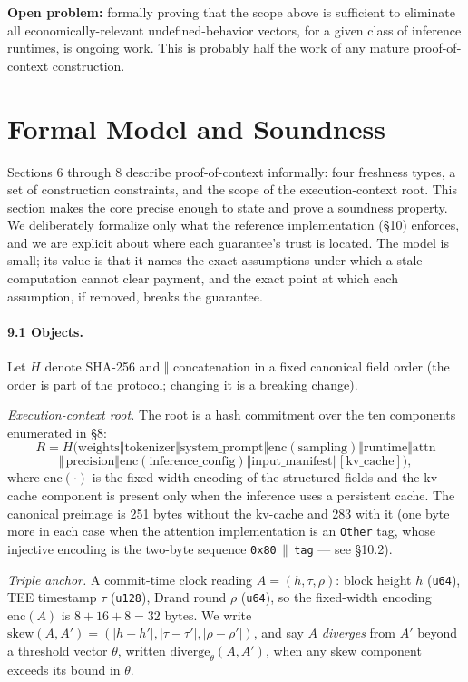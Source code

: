 \documentclass[11pt]{article}
\begin{document}
\textbf{Open problem:} formally proving that the scope above is sufficient to eliminate all economically-relevant undefined-behavior vectors, for a given class of inference runtimes, is ongoing work. This is probably half the work of any mature proof-of-context construction.

\section{Formal Model and Soundness}

Sections 6 through 8 describe proof-of-context informally: four freshness types, a set of construction constraints, and the scope of the execution-context root. This section makes the core precise enough to state and prove a soundness property. We deliberately formalize only what the reference implementation (\S10) enforces, and we are explicit about where each guarantee's trust is located. The model is small; its value is that it names the exact assumptions under which a stale computation cannot clear payment, and the exact point at which each assumption, if removed, breaks the guarantee.

\paragraph{9.1 Objects.} Let $H$ denote SHA-256 and $\Vert$ concatenation in a fixed canonical field order (the order is part of the protocol; changing it is a breaking change).

\emph{Execution-context root.} The root is a hash commitment over the ten components enumerated in \S8:
\[
R = H(\mathrm{weights} \Vert \mathrm{tokenizer} \Vert \mathrm{system\_prompt} \Vert \mathrm{enc(sampling)} \Vert \mathrm{runtime} \Vert \mathrm{attn}
\]
\[
\Vert\, \mathrm{precision} \Vert \mathrm{enc(inference\_config)} \Vert \mathrm{input\_manifest} \Vert [\mathrm{kv\_cache}]),
\]
where $\mathrm{enc}(\cdot)$ is the fixed-width encoding of the structured fields and the kv-cache component is present only when the inference uses a persistent cache. The canonical preimage is 251 bytes without the kv-cache and 283 with it (one byte more in each case when the attention implementation is an \texttt{Other} tag, whose injective encoding is the two-byte sequence \texttt{0x80}\,$\|$\,\texttt{tag} --- see \S10.2).

\emph{Triple anchor.} A commit-time clock reading $A = (h, \tau, \rho)$: block height $h$ (\texttt{u64}), TEE timestamp $\tau$ (\texttt{u128}), Drand round $\rho$ (\texttt{u64}), so the fixed-width encoding $\mathrm{enc}(A)$ is $8+16+8 = 32$ bytes. We write $\mathrm{skew}(A, A') = (|h - h'|, |\tau - \tau'|, |\rho - \rho'|)$, and say $A$ \emph{diverges} from $A'$ beyond a threshold vector $\theta$, written $\mathrm{diverge}_\theta(A, A')$, when any skew component exceeds its bound in $\theta$.
\end{document}
